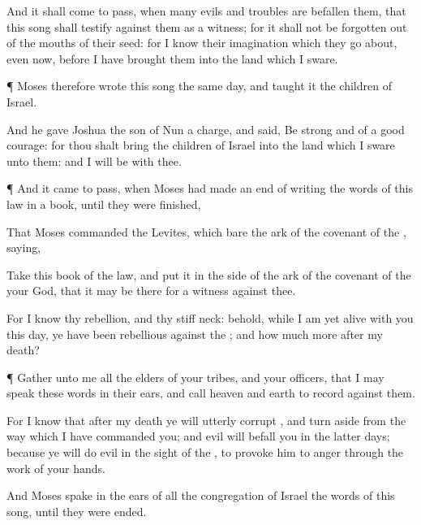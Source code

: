 {And it shall come to pass, when
many
evils and
troubles are
befallen them, that this
song shall
testify
against them as a
witness; for it shall not be
forgotten out of the
mouths of their
seed: for I
know their
imagination which they go
about, even
now, before I have
brought them into the
land which I
sware.


\par }{\PP {}¶
Moses therefore
wrote this
song the same
day, and
taught it the
children of
Israel.

And he gave
Joshua the
son of
Nun a
charge, and
said, Be
strong and of a good
courage: for thou shalt
bring the
children of
Israel into the
land which I
sware unto them: and I will be with thee.


\par }{\PP {}¶ And it came to pass, when
Moses had made an
end of
writing the
words of this
law in a
book, until they were
finished,

That
Moses
commanded the
Levites, which
bare the
ark of the
covenant of the
{},
saying,

Take this
book of the
law, and
put it in the
side of the
ark of the
covenant of the
{} your
God, that it may be there for a
witness against thee.

For I
know thy
rebellion, and thy
stiff
neck: behold, while I am yet
alive with you this
day, ye have been
rebellious against the
{}; and how much more
after my
death?


\par }{\PP {}¶
Gather unto me all the
elders of your
tribes, and your
officers, that I may
speak these
words in their
ears, and
call
heaven and
earth to
record against them.

For I
know that
after my
death ye will
utterly
corrupt
{}, and turn
aside from the
way which I have
commanded you; and
evil will
befall you in the
latter
days; because ye will
do
evil in the
sight of the
{}, to provoke him to
anger through the
work of your
hands.

And
Moses
spake in the
ears of all the
congregation of
Israel the
words of this
song, until they were
ended.




\par }
